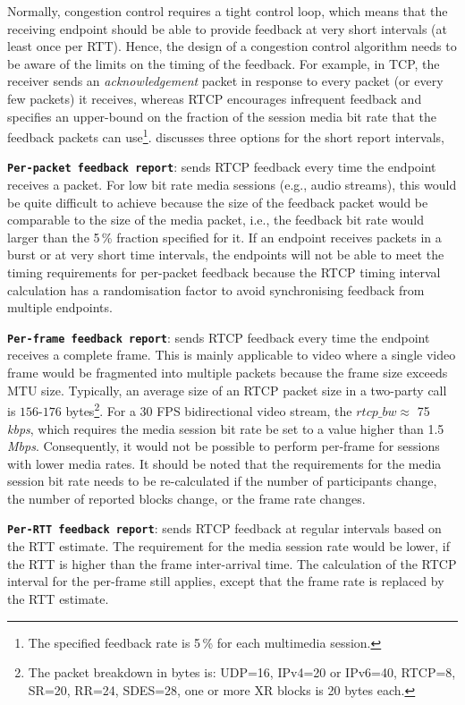 Normally, congestion control requires a tight control loop, which means that
the receiving endpoint should be able to provide feedback at very short
intervals (at least once per RTT). Hence, the design of a congestion control
algorithm needs to be aware of the limits on the timing of the feedback. For
example, in TCP, the receiver sends an \emph{acknowledgement} packet in
response to every packet (or every few packets) it receives, whereas RTCP
encourages infrequent feedback and specifies an upper-bound on the fraction of
the session media bit rate that the feedback packets can use\footnote{The
specified feedback rate is 5\,\% for each multimedia session.}.
\cite{draft.rmcat.feedback} discusses three options for the short report
intervals,

\textbf{\texttt{Per-packet feedback report}}: sends RTCP feedback every time
the endpoint receives a packet. For low bit rate media sessions (e.g., audio
streams), this would be quite difficult to achieve because the size of the
feedback packet would be comparable to the size of the media packet, i.e., the
feedback bit rate would larger than the 5\,\% fraction specified for it. If an
endpoint receives packets in a burst or at very short time intervals, the
endpoints will not be able to meet the timing requirements for per-packet
feedback because the RTCP timing interval calculation has a randomisation
factor to avoid synchronising feedback from multiple endpoints.

\textbf{\texttt{Per-frame feedback report}}: sends RTCP feedback every time
the endpoint receives a complete frame. This is mainly applicable to video
where a single video frame would be fragmented into multiple packets because
the frame size exceeds MTU size. Typically, an average size of an RTCP packet
size in a two-party call is $156$-$176$ bytes\footnote{The packet breakdown in
bytes is: UDP=16, IPv4=20 or IPv6=40, RTCP=8, SR=20, RR=24, SDES=28, one or
more XR blocks is 20 bytes each.}. For a 30 FPS bidirectional video stream, the
$rtcp\_bw \approx$ 75\,\emph{kbps}, which requires the media session bit rate
be set to a value higher than 1.5\,\emph{Mbps}. Consequently, it would not be
possible to perform per-frame for sessions with lower media rates. It should
be noted that the requirements for the media session bit rate needs to be 
re-calculated if the number of participants change, the number of reported
blocks change, or the frame rate changes.

\textbf{\texttt{Per-RTT feedback report}}: sends RTCP feedback at regular
intervals based on the RTT estimate. The requirement for the media session
rate would be lower, if the RTT is higher than the frame inter-arrival time.
The calculation of the RTCP interval for the per-frame still applies, except
that the frame rate is replaced by the RTT estimate.

